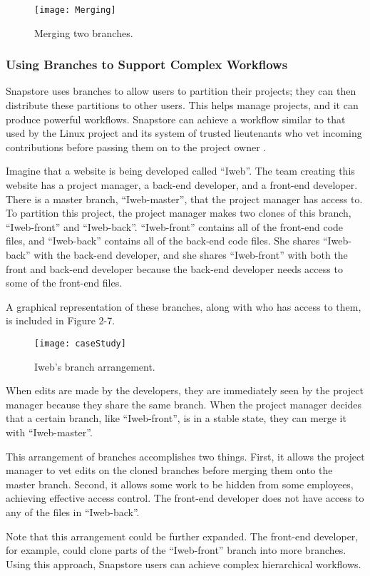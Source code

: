 \begin{figure}
\texttt{[image: Merging]}
\caption{Merging two branches.}
\label{arm:fig1}
\end{figure}

\subsubsection{Using Branches to Support Complex Workflows}

Snapstore uses branches to allow users to partition their projects; they can then distribute these partitions to other users. This helps manage projects, and it can produce powerful workflows. Snapstore can achieve a workflow similar to that used by the Linux project and its system of trusted lieutenants who vet incoming contributions before passing them on to the project owner \cite{linux}.

Imagine that a website is being developed called ``Iweb''. The team creating this website has a project manager, a back-end developer, and a front-end developer. There is a master branch, ``Iweb-master'', that the project manager has access to. To partition this project, the project manager makes two clones of this branch, ``Iweb-front'' and ``Iweb-back''. ``Iweb-front'' contains all of the front-end code files, and ``Iweb-back'' contains all of the back-end code files. She shares ``Iweb-back'' with the back-end developer, and she shares ``Iweb-front'' with both the front and back-end developer because the back-end developer needs access to some of the front-end files.

A graphical representation of these branches, along with who has access to them, is included in Figure 2-7.

\begin{figure}
\texttt{[image: caseStudy]}
\caption{Iweb's branch arrangement.}
\label{arm:fig1}
\end{figure}

When edits are made by the developers, they are immediately seen by the project manager because they share the same branch. When the project manager decides that a certain branch, like ``Iweb-front'', is in a stable state, they can merge it with ``Iweb-master''.

This arrangement of branches accomplishes two things. First, it allows the project manager to vet edits on the cloned branches before merging them onto the master branch. Second, it allows some work to be hidden from some employees, achieving effective access control. The front-end developer does not have access to any of the files in ``Iweb-back''.

Note that this arrangement could be further expanded. The front-end developer, for example, could clone parts of the ``Iweb-front'' branch into more branches. Using this approach, Snapstore users can achieve complex hierarchical workflows. 




